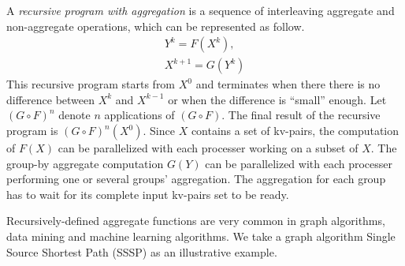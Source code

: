   A \emph{recursive program with aggregation} is a sequence of interleaving aggregate and non-aggregate operations, which can be represented as follow.
\begin{equation}
\label{eq:recursive2}
\begin{aligned}
Y^{k}=F(X^k),\\
X^{k+1}=G(Y^k)
\end{aligned}
\end{equation}
This recursive program starts from $X^0$ and terminates when there there is no difference between $X^k$ and $X^{k-1}$ or when the difference is ``small'' enough. Let $(G\circ F)^n$ denote $n$ applications of $(G\circ F)$. The final result of the recursive program is $(G\circ F)^n(X^0)$. Since $X$ contains a set of kv-pairs, the computation of $F(X)$ can be parallelized with each processer working on a subset of $X$. The group-by aggregate computation $G(Y)$ can be parallelized with each processer performing one or several groups' aggregation. The aggregation for each group has to wait for its complete input kv-pairs set to be ready.

Recursively-defined aggregate functions are very common in graph algorithms, data mining and machine learning algorithms. We take a graph algorithm Single Source Shortest Path (SSSP) as an illustrative example.



